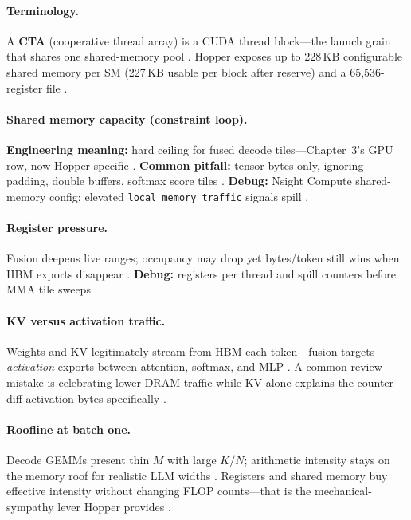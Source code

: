 \paragraph{Terminology.}
A \textbf{CTA} (cooperative thread array) is a CUDA thread block---the launch grain that shares one shared-memory pool \citep{nvidia2022hopper}.
Hopper exposes up to 228\,KB configurable shared memory per SM (227\,KB usable per block after reserve) and a 65{,}536-register file \citep{nvidia2022hopper}.

\paragraph{Shared memory capacity (constraint loop).}
\textbf{Engineering meaning:} hard ceiling for fused decode tiles---Chapter~3's GPU row, now Hopper-specific \citep{yirage2026}.
\textbf{Common pitfall:} tensor bytes only, ignoring padding, double buffers, softmax score tiles \citep{dao2022flashattention}.
\textbf{Debug:} Nsight Compute shared-memory config; elevated \texttt{local memory traffic} signals spill \citep{patel2025llminference}.

\paragraph{Register pressure.}
Fusion deepens live ranges; occupancy may drop yet bytes/token still wins when HBM exports disappear \citep{memoryfloor2026,semianalysis2024tma}.
\textbf{Debug:} registers per thread and spill counters before MMA tile sweeps \citep{yirage2026}.

\paragraph{KV versus activation traffic.}
Weights and KV legitimately stream from HBM each token---fusion targets \emph{activation} exports between attention, softmax, and MLP \citep{kwon2023vllm,memoryfloor2026,dao2022flashattention}.
A common review mistake is celebrating lower DRAM traffic while KV alone explains the counter---diff activation bytes specifically \citep{patel2025llminference,taxbreak2026}.

\paragraph{Roofline at batch one.}
Decode GEMMs present thin $M$ with large $K/N$; arithmetic intensity stays on the memory roof for realistic LLM widths \citep{dlbook,memoryfloor2026}.
Registers and shared memory buy effective intensity without changing FLOP counts---that is the mechanical-sympathy lever Hopper provides \citep{nvidia2022hopper,semianalysis2024tma}.

